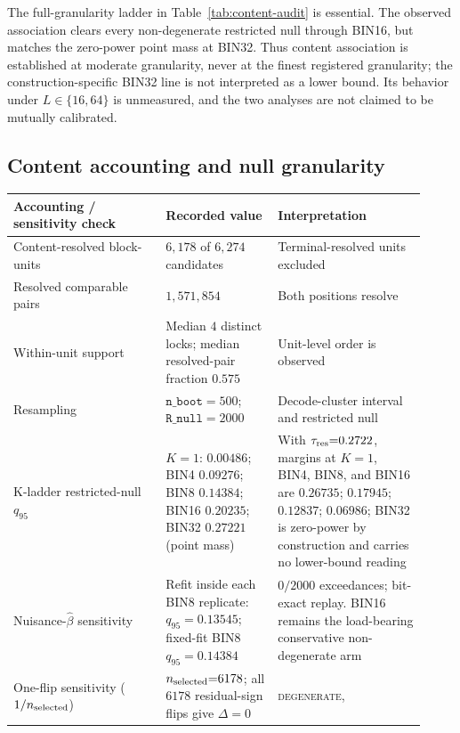 \documentclass{article}
\begin{document}
The full-granularity ladder in Table~\ref{tab:content-audit} is essential. The
observed association clears every non-degenerate restricted null through BIN16,
but matches the zero-power point mass at BIN32. Thus content association is
established at moderate granularity, never at the finest registered granularity;
the construction-specific BIN32 line is not interpreted as a lower bound. Its
behavior under $L\in\{16,64\}$ is unmeasured, and the two analyses are not
claimed to be mutually calibrated.

\subsection{Content accounting and null granularity}

\begin{table}[H]
\centering
\small
\setlength{\tabcolsep}{4pt}
\begin{tabular}{@{}>{\raggedright\arraybackslash}p{0.34\linewidth}
                    >{\raggedright\arraybackslash}p{0.25\linewidth}
                    >{\raggedright\arraybackslash}p{0.33\linewidth}@{}}
\toprule
Accounting / sensitivity check & Recorded value & Interpretation \\
\midrule
Content-resolved block-units & $6{,}178$ of $6{,}274$ candidates &
Terminal-resolved units excluded \\
Resolved comparable pairs & $1{,}571{,}854$ & Both positions resolve \\
Within-unit support & Median $4$ distinct locks; median resolved-pair fraction
$0.575$ & Unit-level order is observed \\
Resampling & $\texttt{n\_boot}{=}500$; $\texttt{R\_null}{=}2000$ &
Decode-cluster interval and restricted null \\
K-ladder restricted-null $q_{95}$ & $K{=}1$: $0.00486$; BIN4 $0.09276$;
BIN8 $0.14384$; BIN16 $0.20235$; BIN32 $0.27221$ (point mass) & With
$\tau_{\rm res}{=}0.2722$, margins at $K{=}1$, BIN4, BIN8, and BIN16 are
$0.26735$; $0.17945$; $0.12837$; $0.06986$; BIN32 is zero-power by construction and
carries no lower-bound reading \\
Nuisance-$\hat\beta$ sensitivity & Refit inside each BIN8 replicate:
$q_{95}{=}0.13545$; fixed-fit BIN8 $q_{95}{=}0.14384$ & $0/2000$ exceedances;
bit-exact replay. BIN16 remains the load-bearing conservative non-degenerate arm \\
One-flip sensitivity ($1/n_{\rm selected}$) & $n_{\rm selected}{=}6178$;
all $6178$ residual-sign flips give $\Delta{=}0$ & \textsc{degenerate},

\end{tabular}
\end{table}
\end{document}
